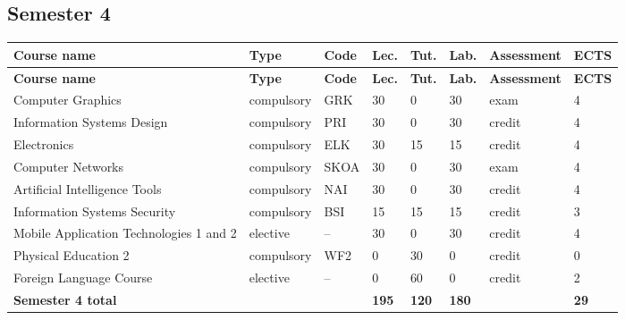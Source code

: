 \documentclass[12pt,a4paper]{article}
\newcommand{\thdrule}{\noalign{\global\setlength{\extrarowheight}{0pt}}}
\newcommand{\thdend}{\noalign{\global\setlength{\extrarowheight}{4pt}}}
\begin{document}
\subsection*{Semester 4}

{\scriptsize
\begin{longtable}{m{5.0cm}m{1.9cm}m{0.75cm}m{0.85cm}m{0.85cm}m{0.85cm}m{1.45cm}m{0.9cm}}
\thdrule\toprule
\rowcolor{pjatkRed}
{\color{white}\footnotesize\textbf{\vphantom{Ag}Course name}} & {\color{white}\footnotesize\textbf{\vphantom{Ag}Type}} & {\color{white}\footnotesize\textbf{\vphantom{Ag}Code}} & {\color{white}\footnotesize\textbf{\vphantom{Ag}Lec.}} & {\color{white}\footnotesize\textbf{\vphantom{Ag}Tut.}} & {\color{white}\footnotesize\textbf{\vphantom{Ag}Lab.}} & {\color{white}\footnotesize\textbf{\vphantom{Ag}Assessment}} & {\color{white}\footnotesize\textbf{\vphantom{Ag}ECTS}} \\
\midrule\thdend
\endfirsthead
\thdrule\toprule
\rowcolor{pjatkRed}
{\color{white}\footnotesize\textbf{\vphantom{Ag}Course name}} & {\color{white}\footnotesize\textbf{\vphantom{Ag}Type}} & {\color{white}\footnotesize\textbf{\vphantom{Ag}Code}} & {\color{white}\footnotesize\textbf{\vphantom{Ag}Lec.}} & {\color{white}\footnotesize\textbf{\vphantom{Ag}Tut.}} & {\color{white}\footnotesize\textbf{\vphantom{Ag}Lab.}} & {\color{white}\footnotesize\textbf{\vphantom{Ag}Assessment}} & {\color{white}\footnotesize\textbf{\vphantom{Ag}ECTS}} \\
\midrule\thdend
\endhead
\rowcolor{tableRowLight} Computer Graphics & {\scriptsize compulsory} & GRK & 30 & 0 & 30 & {\scriptsize exam} & 4 \\
\rowcolor{tableRowAlt} Information Systems Design & {\scriptsize compulsory} & PRI & 30 & 0 & 30 & {\scriptsize credit} & 4 \\
\rowcolor{tableRowLight} Electronics & {\scriptsize compulsory} & ELK & 30 & 15 & 15 & {\scriptsize credit} & 4 \\
\rowcolor{tableRowAlt} Computer Networks & {\scriptsize compulsory} & SKOA & 30 & 0 & 30 & {\scriptsize exam} & 4 \\
\rowcolor{tableRowLight} Artificial Intelligence Tools & {\scriptsize compulsory} & NAI & 30 & 0 & 30 & {\scriptsize credit} & 4 \\
\rowcolor{tableRowAlt} Information Systems Security & {\scriptsize compulsory} & BSI & 15 & 15 & 15 & {\scriptsize credit} & 3 \\
\rowcolor{tableElective} Mobile Application Technologies 1 and 2 & {\scriptsize elective} & -- & 30 & 0 & 30 & {\scriptsize credit} & 4 \\
\rowcolor{tableRowLight} Physical Education 2 & {\scriptsize compulsory} & WF2 & 0 & 30 & 0 & {\scriptsize credit} & 0 \\
\rowcolor{tableElective} Foreign Language Course & {\scriptsize elective} & -- & 0 & 60 & 0 & {\scriptsize credit} & 2 \\
\midrule[\heavyrulewidth]
\rowcolor{tableSummary} \textbf{Semester 4 total} & & & \textbf{195} & \textbf{120} & \textbf{180} & & \textbf{29} \\
\bottomrule
\end{longtable}}
\end{document}
